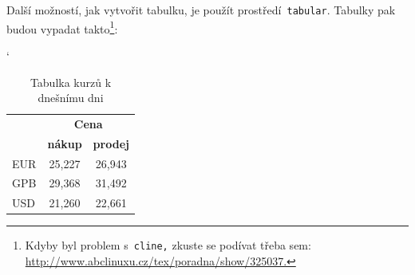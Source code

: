 \documentclass[a4paper,11pt]{article}
\begin{document}
Další možností, jak vytvořit tabulku, je použít prostředí\texttt{ tabular}. Tabulky pak budou vypadat takto\footnote{Kdyby byl problem s\texttt{ cline,} zkuste se podívat třeba sem: \url{http://www.abclinuxu.cz/tex/poradna/show/325037.}}:

\bigskip
\begin{table}[h]
\catcode`
\centering
\begin{tabular}{|l|c|c|}
\hline
\multirow{2}{*}{}   & \multicolumn{2}{|c|}{\textbf{Cena}}       \\ \hhline{~--}
\textbf{Měna}       & \textbf{nákup}        & \textbf{prodej}   \\ \hline
EUR                 & 25,227                   & 26,943         \\ 
GPB                 & 29,368                   & 31,492         \\ 
USD                 & 21,260                   & 22,661         \\ \hline
\end{tabular}
\caption{Tabulka kurzů k dnešnímu dni}
\label{tab1}
\end{table}
\bigskip
\end{document}
